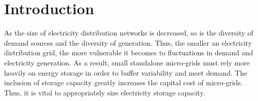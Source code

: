 \documentclass{article}
\begin{document}
\begin{abstract}

\end{abstract}




% 







\section{Introduction}

As the size of electricity distribution networks is decreased,
so is the diversity of demand sources and 
the diversity of generation.
Thus, the smaller an electricity distribution grid, the more vulnerable 
it becomes to fluctuations in demand and electricity generation.
As a result, small standalone micro-grids must rely more heavily on
energy storage in order to buffer variability and meet demand.  
The inclusion of storage capacity greatly increases the capital cost of micro-grids.
Thus, it is vital to appropriately size electricity storage capacity.
\end{document}

